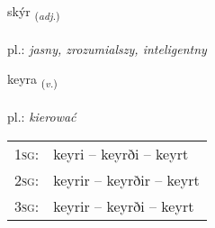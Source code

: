 \documentclass[frontgrid, backgrid]{flacards}\usepackage[]{graphicx}\usepackage[]{xcolor}
\begin{document}
\renewcommand{\flhead}{\vskip5pt \fboxsep=0pt {\small\bfseries\footnotesize Lýsingarorð | Adjective}}
\renewcommand{\fcfoot}{\vskip5pt \fboxsep=0pt \hspace{2pt}{\small\bfseries\footnotesize 2K}}

\renewcommand{\blhead}{\vskip5pt {\small\bfseries\footnotesize Lýsingarorð | Adjective }}
\renewcommand{\bcfoot}{\vskip5pt \hspace{2pt}{\small\bfseries\footnotesize 2K}}


{skýr \small{\textsubscript{(\textit{adj.})}} \\[1ex] %
\textphonetic{[sciːr]} \\
pl.: \emph{jasny, zrozumialszy, inteligentny} \\  [2ex]
\renewcommand*{\arraystretch}{0.8}
}

\renewcommand{\flhead}{\vskip5pt \fboxsep=0pt {\small\bfseries\footnotesize Sagnorð | Verb}}
\renewcommand{\fcfoot}{\vskip5pt \fboxsep=0pt \hspace{2pt}{\small\bfseries\footnotesize 2K}}

\renewcommand{\blhead}{\vskip5pt {\small\bfseries\footnotesize Sagnorð | Verb }}
\renewcommand{\bcfoot}{\vskip5pt \hspace{2pt}{\small\bfseries\footnotesize 2K}}


{keyra \small{\textsubscript{(\textit{v.})}} \\[1ex] %
\textphonetic{[cʰeiːra]} \\
pl.: \emph{kierować} \\  [2ex]
\renewcommand*{\arraystretch}{0.8}
\begin{tabular}{p{1cm}l}
\textsc{1sg}: & keyri -- keyrði -- keyrt \\ 
\textsc{2sg}: & keyrir -- keyrðir -- keyrt \\ 
\textsc{3sg}: & keyrir -- keyrði -- keyrt \\ 
\end{tabular}
}
\end{document}
